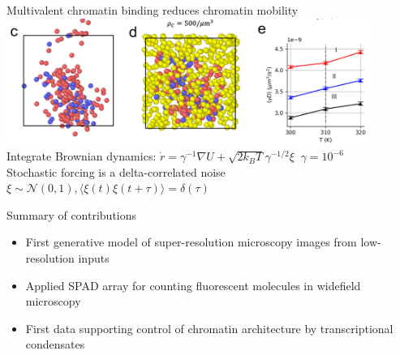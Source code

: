 \documentclass{beamer}					%
\begin{document}
\begin{frame}{Multivalent chromatin binding reduces chromatin mobility}
\includegraphics[width=12cm]{../../brd4/brd4/media/MD-2}
Integrate Brownian dynamics: $\dot{r} = \gamma^{-1}\nabla U + \sqrt{2 k_{B}T}\gamma^{-1/2}\xi \;\; \gamma = 10^{-6}$\\
\vspace{1cm}
Stochastic forcing is a delta-correlated noise $\xi \sim \mathcal{N}(0,1), \langle \xi(t)\xi(t+\tau)\rangle = \delta(\tau)$
\end{frame}


\begin{frame}{Summary of contributions}
\begin{itemize}
\item First generative model of super-resolution microscopy images from low-resolution inputs
\item Applied SPAD array for counting fluorescent molecules in widefield microscopy
\item First data supporting control of chromatin architecture by transcriptional condensates
\end{itemize}
\end{frame}
\end{document}
